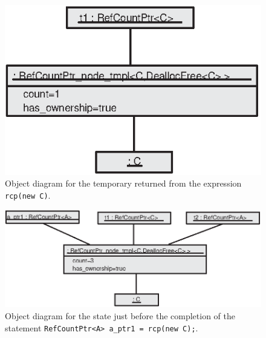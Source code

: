 {\bsinglespace
\begin{figure}
\begin{center}
\includegraphics*[bb= 0.0in 0.0in 2.6in 1.8in,scale=1.0
]{RefCountPtrObjectDiagram_1}
\end{center}
{}\caption{ {}\label{rcp:fig:rcp-object-diagram_m_1} Object diagram
for the temporary returned from the expression {}\texttt{rcp(new
C)}. }
\end{figure}
\esinglespace}

{\bsinglespace
\begin{figure}
\begin{center}
\includegraphics*[bb= 0.0in 0.0in 4.4in 1.8in,scale=1.0
]{RefCountPtrObjectDiagram0}
\end{center}
{}\caption{ {}\label{rcp:fig:rcp-object-diagram_0} Object diagram for
the state just before the completion of the statement
{}\texttt{RefCountPtr<A> a\_ptr1 = rcp(new C);}. }
\end{figure}
\esinglespace}

